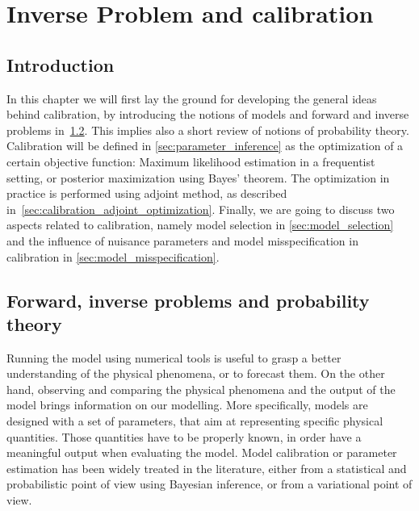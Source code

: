\documentclass[../../Main_ManuscritThese.tex]{subfiles}
\begin{document}
\dominitoc
\faketableofcontents
\showthe\columnwidth
\chapter{Inverse Problem and calibration}
\label{chap:inverse_problem}

\minitoc
\listoftodos
\newpage
\subfileLocal{\pagestyle{contentStyle}}

\section{Introduction}
\label{sec:intro_chap2}
In this chapter we will first lay the ground for developing the general ideas behind calibration, by introducing the notions of models and forward and inverse problems in~\cref{sec:forward_inverse_problem_proba_theory}. This implies also a short review of notions of probability theory. Calibration will be defined in \cref{sec:parameter_inference} as the optimization of a certain objective function: Maximum likelihood estimation in a frequentist setting, or posterior maximization using Bayes' theorem. The optimization in practice is performed using adjoint method, as described in~\cref{sec:calibration_adjoint_optimization}. Finally, we are going to discuss two aspects related to calibration, namely model selection in \cref{sec:model_selection} and the influence of nuisance parameters and model misspecification in calibration in \cref{sec:model_misspecification}.

\section{Forward, inverse problems and probability theory}
\label{sec:forward_inverse_problem_proba_theory}
Running the model using numerical tools is useful to grasp a better understanding of the physical phenomena, or to forecast them. On the other hand, observing and comparing the physical phenomena and the output of the model brings information on our modelling. More specifically, models are designed with a set of parameters, that aim at representing specific physical quantities. Those quantities have to be properly known, in order have a meaningful output when evaluating the model. 
Model calibration or parameter estimation has been widely treated in the literature, either from a statistical and probabilistic point of view using Bayesian inference, or from a variational point of view.
\end{document}
